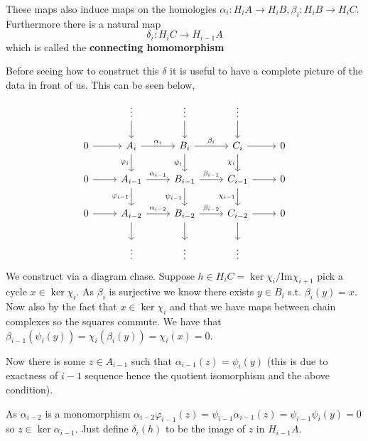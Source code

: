 \documentclass[12pt]{article}
\numberwithin{equation}{section}
\newcommand{\image}{{\mathrm{Im}}}
\begin{document}
\begin{appendices}
	These maps also induce maps on the homologies $\alpha_i: H_i A \to H_i B, \beta_i: H_i B \to H_i C$. Furthermore there is a natural map \[ 	\delta_i : H_i C \to H_{i-1}A	 \] which is called the \textbf{connecting homomorphism}
	
	Before seeing how to construct this $\delta $ it is useful to have a complete picture of the data in front of us. This can be seen below,
	\[\begin{tikzcd}
		& \vdots & \vdots & \vdots \\
		0 & {A_i} & {B_i} & {C_i} & 0 \\
		0 & {A_{i-1}} & {B_{i-1}} & {C_{i-1}} & 0 \\
		0 & {A_{i-2}} & {B_{i-2}} & {C_{i-2}} & 0 \\
		& \vdots & \vdots & \vdots
		\arrow[from=2-1, to=2-2]
		\arrow["{\alpha_i}", from=2-2, to=2-3]
		\arrow["{\beta_i}", from=2-3, to=2-4]
		\arrow[from=2-4, to=2-5]
		\arrow[from=3-1, to=3-2]
		\arrow[from=4-1, to=4-2]
		\arrow["{\alpha_{i-1}}", from=3-2, to=3-3]
		\arrow["{\beta_{i-1}}", from=3-3, to=3-4]
		\arrow[from=3-4, to=3-5]
		\arrow["{\alpha_{i-2}}", from=4-2, to=4-3]
		\arrow["{\beta_{i-2}}", from=4-3, to=4-4]
		\arrow[from=4-4, to=4-5]
		\arrow["{\varphi_i}"', from=2-2, to=3-2]
		\arrow["{\varphi_{i-1}}"', from=3-2, to=4-2]
		\arrow[from=4-2, to=5-2]
		\arrow[from=1-2, to=2-2]
		\arrow[from=1-3, to=2-3]
		\arrow[from=1-4, to=2-4]
		\arrow["{\psi_i}"', from=2-3, to=3-3]
		\arrow["{\chi_i}"', from=2-4, to=3-4]
		\arrow["{\psi_{i-1}}"', from=3-3, to=4-3]
		\arrow["{\chi_{i-1}}"', from=3-4, to=4-4]
		\arrow[from=4-3, to=5-3]
		\arrow[from=4-4, to=5-4]
	\end{tikzcd}\]
	We construct via a diagram chase. Suppose $h \in H_i C= \ker \chi_i / \image \chi_{i+1} $ pick a cycle $x\in \ker \chi_i$. As $\beta_i $ is surjective we know there exists $y \in B_i$ s.t. $\beta_i(y)=x $. Now also by the fact that $x\in \ker \chi_i$ and that we have maps between chain complexes so the squares commute. We have that $\beta_{i-1}(\psi_{i}(y))=\chi_i(\beta_i(y))=\chi_i(x)=0$.
	
	Now there is some $z \in A_{i-1}$ such that $\alpha_{i-1}(z)=\psi_i(y)$ (this is due to exactness of $i-1$ sequence hence the quotient isomorphism and the above condition).
	
	As $\alpha_{i-2}$ is a monomorphism $\alpha_{i-2} \varphi_{i-1}(z)=\psi_{i-1}\alpha_{i-1}(z)=\psi_{i-1}\psi_{i}(y)=0$ so $z\in \ker \alpha_{i-1}$. Just define $\delta_i(h) $ to be the image of $z$ in $H_{i-1}A$.
	

\end{appendices}
\end{document}
